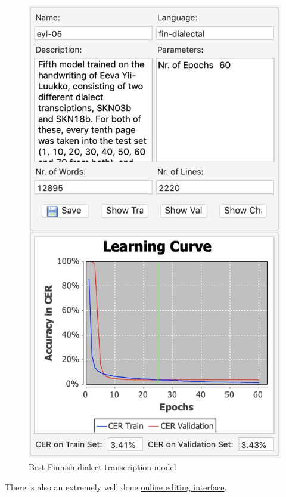 \documentclass[]{book}
\begin{document}
\begin{figure}
\centering
\includegraphics{images/transkribus_skn_model.jpg}
\caption{Best Finnish dialect transcription model}
\end{figure}

There is also an extremely well done \href{https://transkribus.eu/r/read/library/}{online editing interface}.
\end{document}

